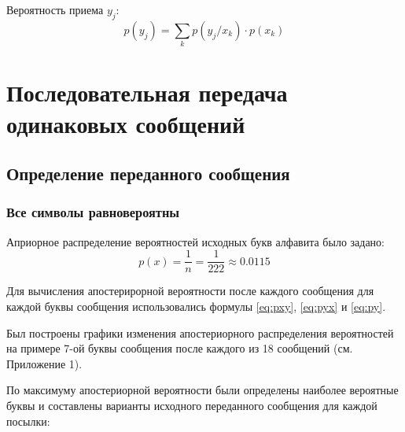 Вероятность приема $y_j$:
\begin{equation}\label{eq:py}
	p(y_j) = \sum_k p(y_j/x_k)\cdot p(x_k)
\end{equation}

\section{Последовательная передача одинаковых сообщений}

\subsection{Определение переданного сообщения}

\subsubsection{Все символы равновероятны}

Априорное распределение вероятностей исходных букв алфавита было задано:
\begin{equation}
	p(x) = \frac{1}{n} = \frac{1}{222} \approx 0.0115
\end{equation}

Для вычисления апостерирорной вероятности после каждого сообщения для каждой буквы сообщения использовались формулы \ref{eq:pxy}, \ref{eq:pyx} и \ref{eq:py}.

Был построены графики изменения апостериорного распределения вероятностей на примере 7-ой буквы сообщения после каждого из 18 сообщений (см. Приложение 1).

По максимуму апостериорной вероятности были определены наиболее вероятные буквы и составлены варианты исходного переданного сообщения для каждой посылки:


